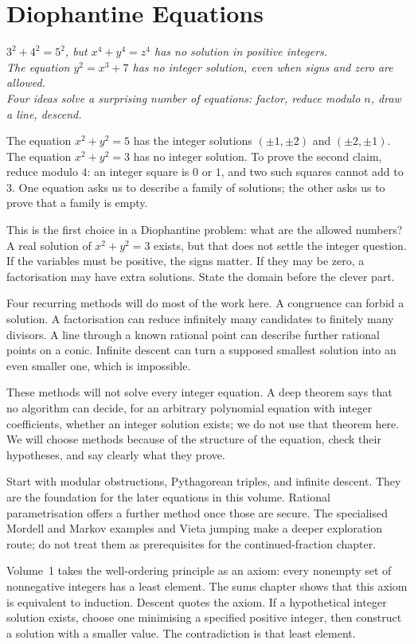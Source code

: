 \chapter{Diophantine Equations}\label{ch:diophantine}

\begin{center}\itshape
$3^2+4^2=5^2$, but $x^4+y^4=z^4$ has no solution in positive integers.\\
The equation $y^2=x^3+7$ has no integer solution, even when signs and zero are allowed.\\
Four ideas solve a surprising number of equations: factor, reduce modulo $n$, draw a line, descend.
\end{center}


The equation $x^2+y^2=5$ has the integer solutions $(\pm1,\pm2)$ and $(\pm2,\pm1)$. The equation $x^2+y^2=3$ has no integer solution. To prove the second claim, reduce modulo $4$: an integer square is $0$ or $1$, and two such squares cannot add to $3$. One equation asks us to describe a family of solutions; the other asks us to prove that a family is empty.

This is the first choice in a Diophantine problem: what are the allowed numbers? A real solution of $x^2+y^2=3$ exists, but that does not settle the integer question. If the variables must be positive, the signs matter. If they may be zero, a factorisation may have extra solutions. State the domain before the clever part.

Four recurring methods will do most of the work here. A congruence can forbid a solution. A factorisation can reduce infinitely many candidates to finitely many divisors. A line through a known rational point can describe further rational points on a conic. Infinite descent can turn a supposed smallest solution into an even smaller one, which is impossible.

These methods will not solve every integer equation. A deep theorem says that no algorithm can decide, for an arbitrary polynomial equation with integer coefficients, whether an integer solution exists; we do not use that theorem here. We will choose methods because of the structure of the equation, check their hypotheses, and say clearly what they prove.

\begin{reminder}
Start with modular obstructions, Pythagorean triples, and infinite descent. They are the foundation for the later equations in this volume. Rational parametrisation offers a further method once those are secure. The specialised Mordell and Markov examples and Vieta jumping make a deeper exploration route; do not treat them as prerequisites for the continued-fraction chapter.

Volume~1 takes the well-ordering principle as an axiom: every nonempty set of
nonnegative integers has a least element. The sums chapter shows that
this axiom is equivalent to induction. Descent quotes the axiom. If a
hypothetical integer solution exists, choose one minimising a specified
positive integer, then construct a solution with a smaller value. The
contradiction is that least element.
\end{reminder}


